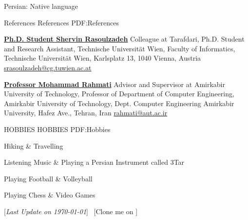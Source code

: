 \documentclass[letterpaper,MMMyyyy,nonstopmode]{resume}
\newcommand{\CVNote}{Last Update on \today}
\begin{document}
\begin{Body}
\Gap
\BulletItem
Persian: Native language


\Section
{References}
{References}
{PDF:References}

\BulletItem
\href{https://www.linkedin.com/in/srasoulzadeh}
{\textbf{Ph.D. Student Shervin Rasoulzadeh}}
\newline
Colleague at Tarafdari,
\newline
Ph.D. Student and Research Assistant, Technische Universität Wien,
\newline
Faculty of Informatics, Technische Universität Wien, Karlsplatz 13, 1040 Vienna, Austria
\newline
\href{mailto:srasoulzadeh@cg.tuwien.ac.at}
{srasoulzadeh@cg.tuwien.ac.at}

\BigGap
\BulletItem
\href{https://aut.ac.ir/cv/2416/Mohammad-Rahmati?slc_lang=en&&cv=2416&mod=scv}
{\textbf{Professor Mohammad Rahmati}}
\newline
Advisor and Supervisor at Amirkabir University of Technology,
\newline
Professor of Department of Computer Engineering, Amirkabir University of Technology,
\newline
Dept. Computer Engineering Amirkabir University, Hafez Ave., Tehran, Iran
\newline
\href{mailto:rahmatiaut.ac.ir}
{rahmati@aut.ac.ir}


\Section
{HOBBIES}
{HOBBIES}
{PDF:Hobbies}

\BulletItem
Hiking \& Travelling

\Gap
\BulletItem
Listening Music \& Playing a Persian Instrument called 3Tar

\Gap
\BulletItem
Playing Football \& Volleyball

\Gap
\BulletItem
Playing Chess \& Video Games


{\UseNoteFont
\hfill
[\textit{\CVNote}]
\SubBulletSymbol\,
[Clone me on
\href{https://github.com/aliyazdi75/Resume}
{\faGithub}]}

\end{Body}
\end{document}
